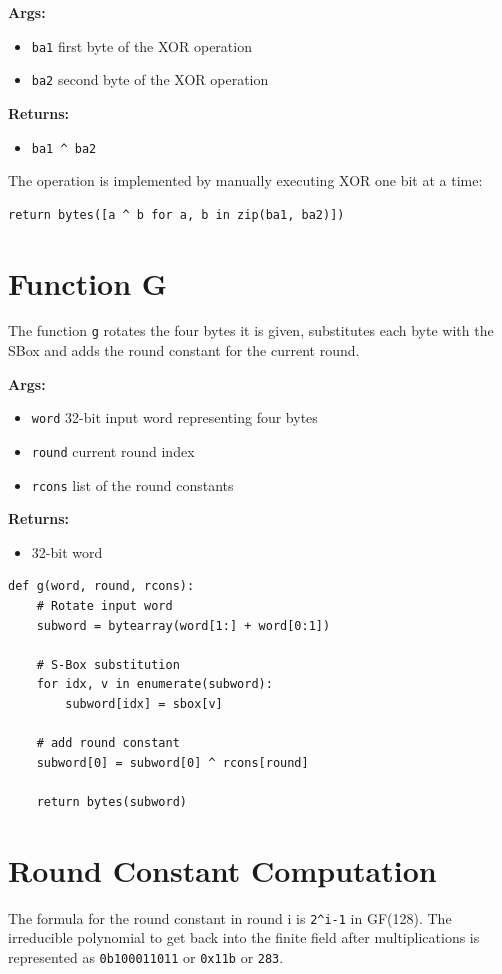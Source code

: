 \textbf{Args:}
\begin{itemize}
  \item \lstinline{ba1} first byte of the XOR operation
  \item \lstinline{ba2} second byte of the XOR operation
\end{itemize}

\textbf{Returns:}
\begin{itemize}
  \item \lstinline{ba1 ^ ba2}
\end{itemize}

The operation is implemented by manually executing XOR one bit at a time:
\begin{lstlisting}
return bytes([a ^ b for a, b in zip(ba1, ba2)])
\end{lstlisting}


\section{Function G}
\label{ch:func_g}

The function \lstinline{g} rotates the four bytes it is given, substitutes each byte with the SBox and adds the round constant for the current round.

\textbf{Args:}
\begin{itemize}
  \item \lstinline{word} 32-bit input word representing four bytes
  \item \lstinline{round} current round index
  \item \lstinline{rcons} list of the round constants
\end{itemize}

\textbf{Returns:}
\begin{itemize}
  \item 32-bit word
\end{itemize}

\begin{lstlisting}
def g(word, round, rcons):
    # Rotate input word
    subword = bytearray(word[1:] + word[0:1])

    # S-Box substitution
    for idx, v in enumerate(subword):
        subword[idx] = sbox[v]

    # add round constant
    subword[0] = subword[0] ^ rcons[round]

    return bytes(subword)
\end{lstlisting}


\section{Round Constant Computation}
The formula for the round constant in round i is  \lstinline{2^i-1} in GF(128). The irreducible polynomial to get back into the finite field after multiplications is represented as  \lstinline{0b100011011} or  \lstinline{0x11b} or  \lstinline{283}.

